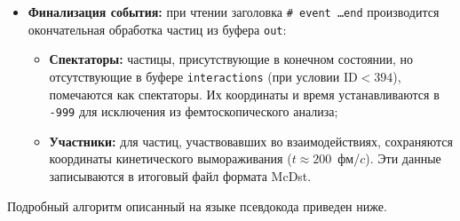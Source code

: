 \documentclass{extarticle}
\begin{document}
\begin{itemize}
                \item \textbf{Финализация события:} 
                    при чтении заголовка \texttt{\# event \ldots end} 
                    производится окончательная обработка частиц из буфера \texttt{out}:
                    \begin{itemize}
                        \item \textbf{Спектаторы:}
                            частицы, присутствующие в конечном состоянии, 
                            но отсутствующие в буфере \texttt{interactions} 
                            (при условии $\text{ID} < 394$), помечаются как спектаторы. 
                            Их координаты и время устанавливаются в \texttt{-999} 
                            для исключения из фемтоскопического анализа;
                        \item \textbf{Участники:} 
                            для частиц, участвовавших во взаимодействиях, сохраняются 
                            координаты кинетического вымораживания ($t \approx 200$~фм/$c$). 
                            Эти данные записываются в итоговый файл формата McDst.
                    \end{itemize}
            \end{itemize}

            Подробный алгоритм описанный на языке псевдокода приведен ниже.
\end{document}
